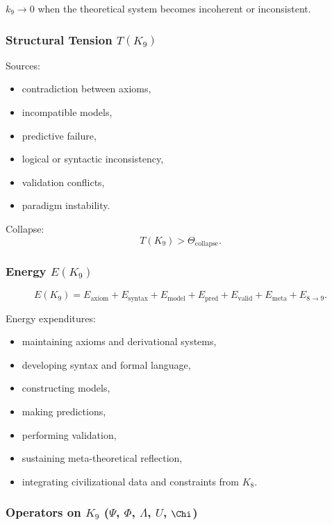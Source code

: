 $k_9 \to 0$ when the theoretical system becomes incoherent or inconsistent.

\subsubsection{Structural Tension \texorpdfstring{$T(K_9)$}{T(K_9)}}

Sources:
\begin{itemize}
    \item contradiction between axioms,
    \item incompatible models,
    \item predictive failure,
    \item logical or syntactic inconsistency,
    \item validation conflicts,
    \item paradigm instability.
\end{itemize}

Collapse:
\[
T(K_9) > \Theta_{\mathrm{collapse}}.
\]

\subsubsection{Energy \texorpdfstring{$E(K_9)$}{E(K_9)}}

\[
E(K_9)=
E_{\mathrm{axiom}}+
E_{\mathrm{syntax}}+
E_{\mathrm{model}}+
E_{\mathrm{pred}}+
E_{\mathrm{valid}}+
E_{\mathrm{meta}}+
E_{8\to9}.
\]

Energy expenditures:
\begin{itemize}
    \item maintaining axioms and derivational systems,
    \item developing syntax and formal language,
    \item constructing models,
    \item making predictions,
    \item performing validation,
    \item sustaining meta-theoretical reflection,
    \item integrating civilizational data and constraints from $K_8$.
\end{itemize}

\subsubsection{Operators on \texorpdfstring{$K_9$}{K_9} (\texorpdfstring{$\Psi$}{\Psi}, \texorpdfstring{$\Phi$}{\Phi}, \texorpdfstring{$\Lambda$}{\Lambda}, \texorpdfstring{$U$}{U}, \texorpdfstring{$\Chi$}{\Chi})}

